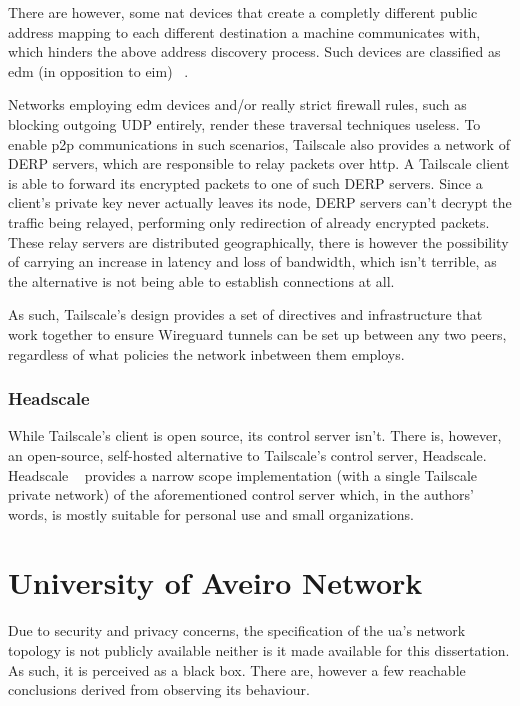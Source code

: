 \documentclass[11pt,twoside,a4paper]{report}
\begin{document}
There are however, some \ac{nat} devices that create a completly different public address mapping to each different destination a machine communicates with, which hinders the above address discovery process. Such devices are classified as \ac{edm} (in opposition to \ac{eim}) ~\cite{rfc4787}.

Networks employing \ac{edm} devices and/or really strict firewall rules, such as blocking outgoing UDP entirely, render these traversal techniques useless. To enable \ac{p2p} communications in such scenarios, Tailscale also provides a network of \ac{DERP} servers, which are responsible to relay packets over \ac{http}. A Tailscale client is able to forward its encrypted packets to one of such \ac{DERP} servers. Since a client's private key never actually leaves its node, \ac{DERP} servers can't decrypt the traffic being relayed, performing only redirection of already encrypted packets. These relay servers are distributed geographically, there is however the possibility of carrying an increase in latency and loss of bandwidth, which isn't terrible, as the alternative is not being able to establish connections at all.

As such, Tailscale's design provides a set of directives and infrastructure that work together to ensure Wireguard tunnels can be set up between any two peers, regardless of what policies the network inbetween them employs.

\subsubsection{Headscale}

While Tailscale's client is open source, its control server isn't. There is, however, an open-source, self-hosted alternative to Tailscale's control server, Headscale. Headscale ~\cite{headscale2023online} provides a narrow scope implementation (with a single Tailscale private network) of the aforementioned control server which, in the authors' words, is mostly suitable for personal use and small organizations.


\section{University of Aveiro Network}

Due to security and privacy concerns, the specification of the \ac{ua}'s network topology is not publicly available neither is it made available for this dissertation. As such, it is perceived as a black box. There are, however a few reachable conclusions derived from observing its behaviour.
\end{document}

